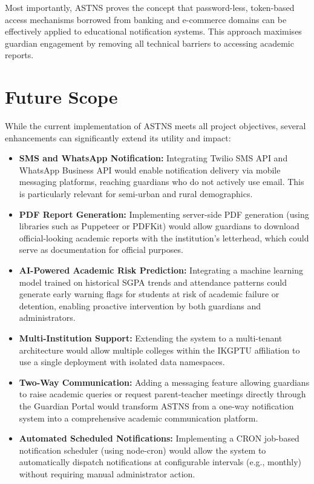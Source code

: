 \documentclass[12pt,a4paper]{report}
\begin{document}
Most importantly, ASTNS proves the concept that password-less, token-based access mechanisms borrowed from banking and e-commerce domains can be effectively applied to educational notification systems. This approach maximises guardian engagement by removing all technical barriers to accessing academic reports.

\section{Future Scope}
While the current implementation of ASTNS meets all project objectives, several enhancements can significantly extend its utility and impact:

\begin{itemize}
  \item \textbf{SMS and WhatsApp Notification:} Integrating Twilio SMS API and WhatsApp Business API would enable notification delivery via mobile messaging platforms, reaching guardians who do not actively use email. This is particularly relevant for semi-urban and rural demographics.

  \item \textbf{PDF Report Generation:} Implementing server-side PDF generation (using libraries such as Puppeteer or PDFKit) would allow guardians to download official-looking academic reports with the institution's letterhead, which could serve as documentation for official purposes.

  \item \textbf{AI-Powered Academic Risk Prediction:} Integrating a machine learning model trained on historical SGPA trends and attendance patterns could generate early warning flags for students at risk of academic failure or detention, enabling proactive intervention by both guardians and administrators.

  \item \textbf{Multi-Institution Support:} Extending the system to a multi-tenant architecture would allow multiple colleges within the IKGPTU affiliation to use a single deployment with isolated data namespaces.

  \item \textbf{Two-Way Communication:} Adding a messaging feature allowing guardians to raise academic queries or request parent-teacher meetings directly through the Guardian Portal would transform ASTNS from a one-way notification system into a comprehensive academic communication platform.

  \item \textbf{Automated Scheduled Notifications:} Implementing a CRON job-based notification scheduler (using node-cron) would allow the system to automatically dispatch notifications at configurable intervals (e.g., monthly) without requiring manual administrator action.


\end{itemize}
\end{document}
